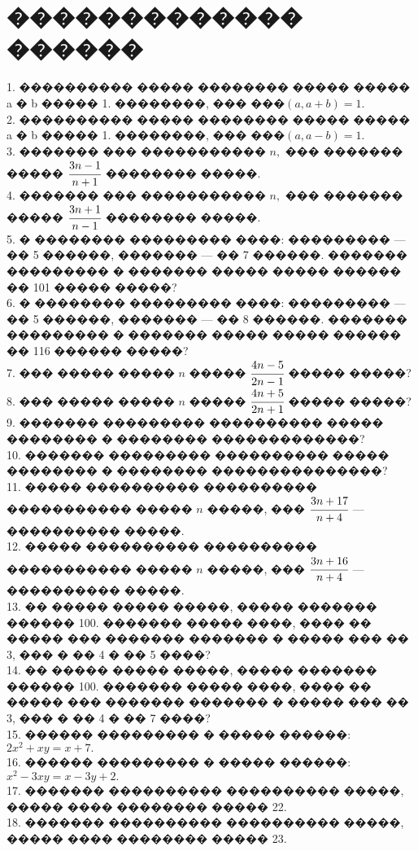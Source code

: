 \documentclass[12pt]{article}
\begin{document}
\section{������������� ������}
1. ���������� ����� �������� ����� ����� a � b ����� 1. ��������, ���
���$(a, a+b)=1.$\\
2. ���������� ����� �������� ����� ����� a � b ����� 1. ��������, ���
���$(a, a-b)=1.$\\
3. ������� ��� ����������� $n,$ ��� ������� ����� $\cfrac{3n-1}{n+1}$ �������� �����.\\
4. ������� ��� ����������� $n,$ ��� ������� ����� $\cfrac{3n+1}{n-1}$ �������� �����.\\
5. � �������� ��������� ����: ��������� --- �� 5 ������, ������� --- �� 7 ������. ������� ��������� � ������� ����� ����� ������ �� 101 ����� �����?\\
6. � �������� ��������� ����: ��������� --- �� 5 ������, ������� --- �� 8 ������. ������� ��������� � ������� ����� ����� ������ �� 116 ������ �����?\\
7. ��� ����� ����� $n$ ����� $\cfrac{4n-5}{2n-1}$ ����� �����?\\
8. ��� ����� ����� $n$ ����� $\cfrac{4n+5}{2n+1}$ ����� �����?\\
9. ������� ��������� ���������� ����� �������� � �������� �������������?\\
10. ������� ��������� ���������� ����� �������� � �������� ���������������?\\
11. ����� ���������� ���������� ����������� ����� $n$ �����, ��� $\cfrac{3n+17}{n+4}$ --- ���������� �����.\\
12. ����� ���������� ���������� ����������� ����� $n$ �����, ��� $\cfrac{3n+16}{n+4}$ --- ���������� �����.\\
13. �� ����� ����� �����, ����� ������� ������ 100. ������� ����� ����, ���� �� ����� ��� ������� ������� � ����� ��� �� 3, ��� � �� 4 � �� 5 ����?\\
14. �� ����� ����� �����, ����� ������� ������ 100. ������� ����� ����, ���� �� ����� ��� ������� ������� � ����� ��� �� 3, ��� � �� 4 � �� 7 ����?\\
15. ������ ��������� � ����� ������: $2x^2+xy=x+7.$\\
16. ������ ��������� � ����� ������: $x^2-3xy=x-3y+2.$\\
17. ������� ���������� ���������� �����, ����� ���� �������� ����� 22.\\
18. ������� ���������� ���������� �����, ����� ���� �������� ����� 23.\\
\end{document}
